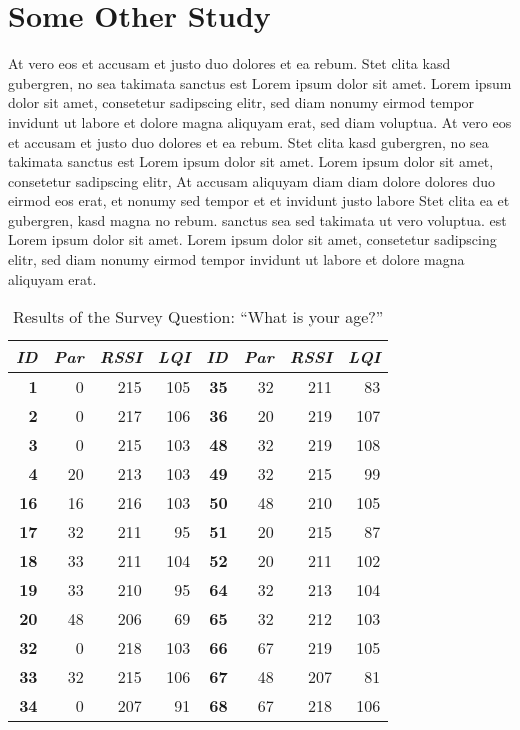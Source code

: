 \section{Some Other Study}
At vero eos et accusam et justo duo dolores et ea rebum. Stet clita kasd
gubergren, no sea takimata sanctus est Lorem ipsum dolor sit amet. Lorem ipsum
dolor sit amet, consetetur sadipscing elitr,  sed diam nonumy eirmod tempor
invidunt ut labore et dolore magna aliquyam erat, sed diam voluptua. At vero
eos et accusam et justo duo dolores et ea rebum. Stet clita kasd gubergren, no
sea takimata sanctus est Lorem ipsum dolor sit amet. Lorem ipsum dolor sit
amet, consetetur sadipscing elitr,  At accusam aliquyam diam diam dolore
dolores duo eirmod eos erat, et nonumy sed tempor et et invidunt justo labore
Stet clita ea et gubergren, kasd magna no rebum. sanctus sea sed takimata ut
vero voluptua. est Lorem ipsum dolor sit amet. Lorem ipsum dolor sit amet,
consetetur sadipscing elitr,  sed diam nonumy eirmod tempor invidunt ut labore
et dolore magna aliquyam erat. 

\begin{table}
\begin{center}
\begin{tabular}{|r|r|r|r||r|r|r|r|}
\hline \textbf{\textit{ID}} & \textbf{\textit{Par}} & \textbf{\textit{RSSI}} &
\textbf{\textit{LQI}} &
\textbf{\textit{ID}} & \textbf{\textit{Par}} & \textbf{\textit{RSSI}} & \textbf{\textit{LQI}} \\
\hline \hline
\textbf{1}  &  0 & 215 & 105 & \textbf{35} & 32 & 211 &  83 \\
\textbf{2}  &  0 & 217 & 106 & \textbf{36} & 20 & 219 & 107 \\
\textbf{3}  &  0 & 215 & 103 & \textbf{48} & 32 & 219 & 108 \\
\textbf{4}  & 20 & 213 & 103 & \textbf{49} & 32 & 215 &  99 \\
\textbf{16} & 16 & 216 & 103 & \textbf{50} & 48 & 210 & 105 \\
\textbf{17} & 32 & 211 &  95 & \textbf{51} & 20 & 215 &  87 \\
\textbf{18} & 33 & 211 & 104 & \textbf{52} & 20 & 211 & 102 \\
\textbf{19} & 33 & 210 &  95 & \textbf{64} & 32 & 213 & 104 \\
\textbf{20} & 48 & 206 &  69 & \textbf{65} & 32 & 212 & 103 \\
\textbf{32} &  0 & 218 & 103 & \textbf{66} & 67 & 219 & 105 \\
\textbf{33} & 32 & 215 & 106 & \textbf{67} & 48 & 207 &  81 \\
\textbf{34} &  0 & 207 &  91 & \textbf{68} & 67 & 218 & 106 \\
\hline
\end{tabular}
\caption{Results of the Survey Question: ``What is your age?''}
\end{center}
\end{table}


